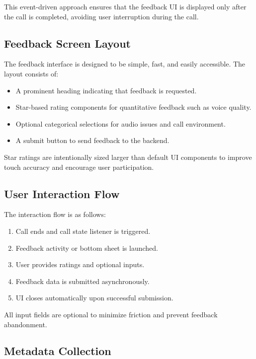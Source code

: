 \documentclass{article}
\begin{document}
This event-driven approach ensures that the feedback UI is displayed only after the call is completed, avoiding user interruption during the call.

\subsection{Feedback Screen Layout}

The feedback interface is designed to be simple, fast, and easily accessible. The layout consists of:

\begin{itemize}
    \item A prominent heading indicating that feedback is requested.
    \item Star-based rating components for quantitative feedback such as voice quality.
    \item Optional categorical selections for audio issues and call environment.
    \item A submit button to send feedback to the backend.
\end{itemize}

Star ratings are intentionally sized larger than default UI components to improve touch accuracy and encourage user participation.

\subsection{User Interaction Flow}

The interaction flow is as follows:
\begin{enumerate}
    \item Call ends and call state listener is triggered.
    \item Feedback activity or bottom sheet is launched.
    \item User provides ratings and optional inputs.
    \item Feedback data is submitted asynchronously.
    \item UI closes automatically upon successful submission.
\end{enumerate}

All input fields are optional to minimize friction and prevent feedback abandonment.

\subsection{Metadata Collection}
\end{document}
